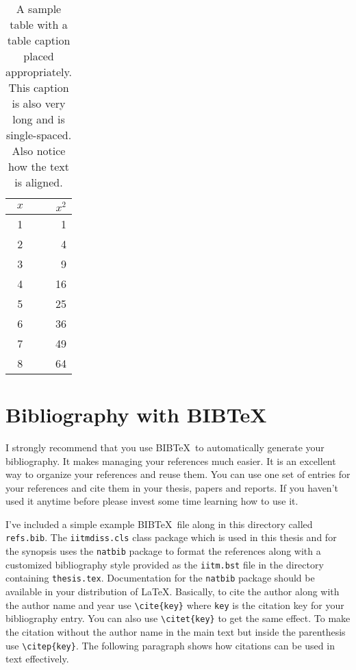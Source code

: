\documentclass[BTech]{iitmdiss}
\begin{document}
 \begin{table}[htbp]
   \caption{A sample table with a table caption placed
     appropriately. This caption is also very long and is
     single-spaced.  Also notice how the text is aligned.}
   \begin{center}
   \begin{tabular}[c]{|c|r|} \hline
     $x$ & $x^2$ \\ \hline
     1  &  1   \\
     2  &  4  \\
     3  &  9  \\
     4  &  16  \\
     5  &  25  \\
     6  &  36  \\
     7  &  49  \\
     8  &  64  \\ \hline
   \end{tabular}
   \label{tab:sample}
   \end{center}
 \end{table}
 
 \section{Bibliography with BIB\TeX}
 
 I strongly recommend that you use BIB\TeX\ to automatically generate
 your bibliography.  It makes managing your references much easier.  It
 is an excellent way to organize your references and reuse them.  You
 can use one set of entries for your references and cite them in your
 thesis, papers and reports.  If you haven't used it anytime before
 please invest some time learning how to use it.  
 
 I've included a simple example BIB\TeX\ file along in this directory
 called \verb+refs.bib+.  The \verb+iitmdiss.cls+ class package which
 is used in this thesis and for the synopsis uses the \verb+natbib+
 package to format the references along with a customized bibliography
 style provided as the \verb+iitm.bst+ file in the directory containing
 \verb+thesis.tex+.  Documentation for the \verb+natbib+ package should
 be available in your distribution of \LaTeX.  Basically, to cite the
 author along with the author name and year use \verb+\cite{key}+ where
 \verb+key+ is the citation key for your bibliography entry.  You can
 also use \verb+\citet{key}+ to get the same effect.  To make the
 citation without the author name in the main text but inside the
 parenthesis use \verb+\citep{key}+.  The following paragraph shows how
 citations can be used in text effectively.
 
\end{document}
